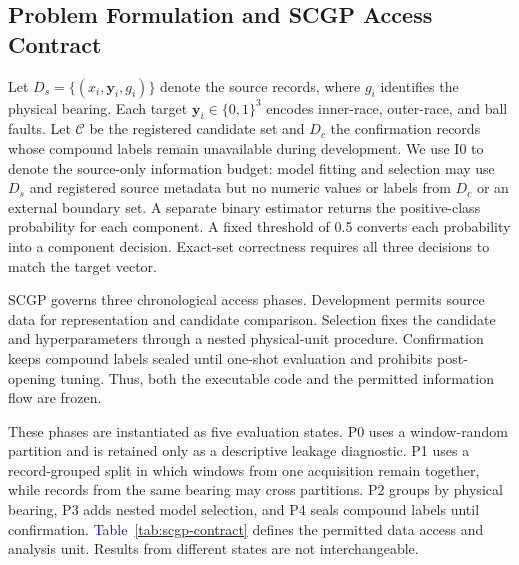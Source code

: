 \documentclass[machines,article,submit,oneauthor,pdftex]{Definitions/mdpi}
\newcommand{\tbl}[1]{\textcolor{blue}{Table~#1}}
\begin{document}
\subsection{Problem Formulation and SCGP Access Contract}

Let $D_s=\{(x_i,\mathbf{y}_i,g_i)\}$ denote the source records, where $g_i$ identifies the physical bearing. Each target $\mathbf{y}_i\in\{0,1\}^{3}$ encodes inner-race, outer-race, and ball faults. Let $\mathcal{C}$ be the registered candidate set and $D_c$ the confirmation records whose compound labels remain unavailable during development. We use I0 to denote the source-only information budget: model fitting and selection may use $D_s$ and registered source metadata but no numeric values or labels from $D_c$ or an external boundary set. A separate binary estimator returns the positive-class probability for each component. A fixed threshold of 0.5 converts each probability into a component decision. Exact-set correctness requires all three decisions to match the target vector.

SCGP governs three chronological access phases. Development permits source data for representation and candidate comparison. Selection fixes the candidate and hyperparameters through a nested physical-unit procedure. Confirmation keeps compound labels sealed until one-shot evaluation and prohibits post-opening tuning. Thus, both the executable code and the permitted information flow are frozen.

These phases are instantiated as five evaluation states. P0 uses a window-random partition and is retained only as a descriptive leakage diagnostic. P1 uses a record-grouped split in which windows from one acquisition remain together, while records from the same bearing may cross partitions. P2 groups by physical bearing, P3 adds nested model selection, and P4 seals compound labels until confirmation. \tbl{\ref{tab:scgp-contract}} defines the permitted data access and analysis unit. Results from different states are not interchangeable.
\end{document}
